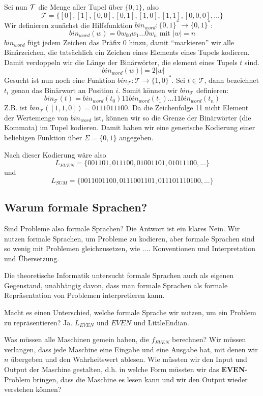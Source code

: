 \noindent
Sei nun $\cal{T}$ die Menge aller Tupel über $\{0,1\}$, also
\[
    \mathcal{T} = \{[0], [1], [0,0], [0,1], [1,0], [1,1], [0,0,0], \ldots \}
\]
Wir definieren zunächst die Hilfsfunktion $bin_{word}: \{0,1\}^* \rightarrow \{0,1\}^*$:
\[
    bin_{word}(w) = 0w_00w_1\ldots0w_n \text{ mit } |w| = n
\]
$bin_{word}$ fügt jedem Zeichen das Präfix 0 hinzu,
damit ``markieren'' wir alle Binärzeichen,
die tatsächlich ein Zeichen eines Elements eines Tupels kodieren.
Damit verdoppeln wir die Länge der Binärwörter, die element eines Tupels $t$ sind.
\[
    |bin_{word}(w)| = 2|w| 
\]
Gesucht ist nun noch eine Funktion $bin_{\mathcal{T}}: \mathcal{T} \rightarrow \{1,0\}^*$.
Sei $t \in \mathcal{T}$, dann bezeichnet $t_i$ genau das Binärwort an Position $i$.
Somit können wir $bin_{\mathcal{T}}$ definieren:
\[
    bin_{\mathcal{T}}(t) = bin_{word}(t_0)11bin_{word}(t_1)\ldots 11bin_{word}(t_{n})
\]
Z.B. ist $bin_{\mathcal{T}}([1,1,0]) = 0111011100$.
Da die Zeichenfolge 11 nicht Element der Wertemenge von $bin_{word}$ ist,
können wir so die Grenze der Binärwörter (die Kommata) im Tupel kodieren.
Damit haben wir eine generische Kodierung einer beliebigen Funktion
über $\Sigma = \{0,1\}$ angegeben.

Nach dieser Kodierung wäre also 
\[
    L_{EVEN} = \{001101, 011100, 01001101, 01011100, \ldots \}
\]
und
\[
    L_{SUM} = \{0011001100, 0111001101, 011101110100, \ldots \}
\]

\subsection{Warum formale Sprachen?}\label{subsec:warumFormaleSprachen}

Sind Probleme also formale Sprachen?
Die Antwort ist ein klares Nein.
Wir nutzen formale Sprachen, um Probleme zu kodieren,
aber formale Sprachen sind so wenig mit Problemen gleichzusetzen,
wie $\ldots$.
Konventionen und Interpretation und Übersetzung.

Die theoretische Informatik untersucht formale Sprachen auch als eigenen Gegenstand,
unabhängig davon, dass man formale Sprachen als formale Repräsentation von Problemen
interpretieren kann.

Macht es einen Unterschied, welche formale Sprache wir nutzen,
um ein Problem zu repräsentieren? Ja.
$L_{EVEN}$ und $EVEN$ und LittleEndian.

Was müssen alle Maschinen gemein haben, die $f_{EVEN}$ berechnen?
Wir müssen verlangen,
dass jede Maschine eine Eingabe und eine Ausgabe hat,
mit denen wir $n$ übergeben und den Wahrheitswert ablesen.
Wie müssten wir den Input und Output der Maschine gestalten,
d.h. in welche Form müssten wir das \textbf{EVEN}-Problem bringen,
dass die Maschine es lesen kann und wir den Output wieder verstehen können? 

